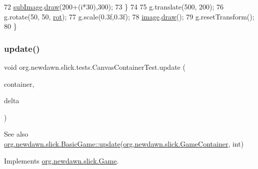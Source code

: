 \begin{DoxyCode}
72             \mbox{\hyperlink{classorg_1_1newdawn_1_1slick_1_1tests_1_1_canvas_container_test_ac5ff4e8d153671ca0a92083077dcb016}{subImage}}.\mbox{\hyperlink{classorg_1_1newdawn_1_1slick_1_1_image_a9bddcca05c7140ab45df8ac5b250b6cd}{draw}}(200+(i*30),300);
73         \}
74         
75         g.translate(500, 200);
76         g.rotate(50, 50, \mbox{\hyperlink{classorg_1_1newdawn_1_1slick_1_1tests_1_1_canvas_container_test_a330cd20f94bab9b77c601d707256dc62}{rot}});
77         g.scale(0.3f,0.3f);
78         \mbox{\hyperlink{classorg_1_1newdawn_1_1slick_1_1tests_1_1_canvas_container_test_ab4b36d2c86487188a6813d9ea094ea78}{image}}.\mbox{\hyperlink{classorg_1_1newdawn_1_1slick_1_1_image_a9bddcca05c7140ab45df8ac5b250b6cd}{draw}}();
79         g.resetTransform();
80     \}
\end{DoxyCode}
\mbox{\label{classorg_1_1newdawn_1_1slick_1_1tests_1_1_canvas_container_test_a6c511126bf46494813648fab72845c9c}} 
\subsubsection{\texorpdfstring{update()}{update()}}
{\footnotesize\ttfamily void org.\+newdawn.\+slick.\+tests.\+Canvas\+Container\+Test.\+update (\begin{DoxyParamCaption}\item[{\mbox{\hyperlink{classorg_1_1newdawn_1_1slick_1_1_game_container}{Game\+Container}}}]{container,  }\item[{int}]{delta }\end{DoxyParamCaption})\hspace{0.3cm}{\ttfamily [inline]}}

\begin{DoxySeeAlso}{See also}
\mbox{\hyperlink{classorg_1_1newdawn_1_1slick_1_1_basic_game_acfe6fa05aef83bff1631af91a3e4bd20}{org.\+newdawn.\+slick.\+Basic\+Game\+::update}}(\mbox{\hyperlink{classorg_1_1newdawn_1_1slick_1_1_game_container}{org.\+newdawn.\+slick.\+Game\+Container}}, int) 
\end{DoxySeeAlso}


Implements \mbox{\hyperlink{interfaceorg_1_1newdawn_1_1slick_1_1_game_ab07b2e9463ee4631620dde0de25bdee8}{org.\+newdawn.\+slick.\+Game}}.


